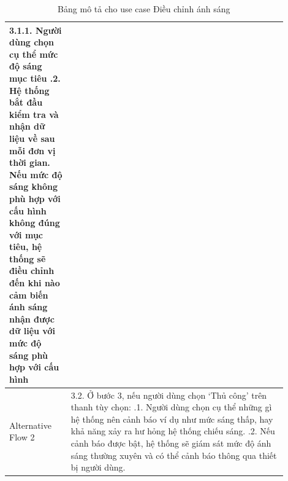 \begin{table}[H]
\begin{tabular}{|p{0.2\linewidth}|p{0.7\linewidth}|}
    3.1.1. Người dùng chọn cụ thể mức độ sáng mục tiêu \newline
    3.1.2. Hệ thống bắt đầu kiểm tra và nhận dữ liệu về sau mỗi đơn vị thời gian. Nếu mức độ sáng không phù hợp với cấu hình không đúng với mục tiêu, hệ thống sẽ điều chỉnh đến khi nào cảm biến ánh sáng nhận được dữ liệu với mức độ sáng phù hợp với cấu hình   \\ \hline
Alternative Flow 2          & 
    3.2. Ở bước 3, nếu người dùng chọn `Thủ công' trên thanh tùy chọn: \newline
    3.2.1. Người dùng chọn cụ thể những gì hệ thống nên cảnh báo ví dụ như mức sáng thấp, hay khả năng xảy ra hư hỏng hệ thống chiếu sáng. \newline
    3.2.2. Nếu cảnh báo được bật, hệ thống sẽ giám sát mức độ ánh sáng thường xuyên và có thể cảnh báo thông qua thiết bị người dùng. \\ \hline
\end{tabular}
\caption{Bảng mô tả cho use case Điều chỉnh ánh sáng}
\end{table}

